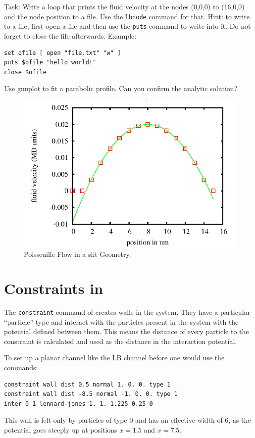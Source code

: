 Task: Write a loop that prints the fluid velocity at the nodes (0,0,0) to (16,0,0)
and the node position to a file. Use the \lstinline|lbnode| command for that. Hint: to write 
to a file, first open a file and then use the \lstinline|puts| command to write 
into it. Do not forget to close the file afterwards. Example:
\vspace{ 0,2cm}
\begin{lstlisting}[numbers=none]
set ofile [ open "file.txt" "w" ]
puts $ofile "hello world!"
close $ofile
\end{lstlisting}
\vspace{ 0,2cm}
Use gnuplot to fit a parabolic profile. Can you confirm the analytic solution?
\begin{figure}[h]
  \begin{center}
    \includegraphics{../figs/poisseuille.pdf}
  \end{center}
  \caption{Poisseuille Flow in a slit Geometry.}
\end{figure}

\section{Constraints in \ES{}}
The \lstinline|constraint| command of \ES{} creates walls in the system.
They have a particular ``particle'' type and interact with the particles
present in the system with the potential defined 
between them. This means the distance
of every particle to the constraint is calculated and used as the distance 
in the interaction potential.

To set up a planar channel like the LB channel before one would use the commands:
\begin{lstlisting}[numbers=none]
constraint wall dist 0.5 normal 1. 0. 0. type 1
constraint wall dist -8.5 normal -1. 0. 0. type 1
inter 0 1 lennard-jones 1. 1. 1.225 0.25 0
\end{lstlisting}
This wall is felt only by particles of type 0 and has an effective width
of 6, as the potential goes steeply up at positions $x=1.5$ and $x=7.5$.

